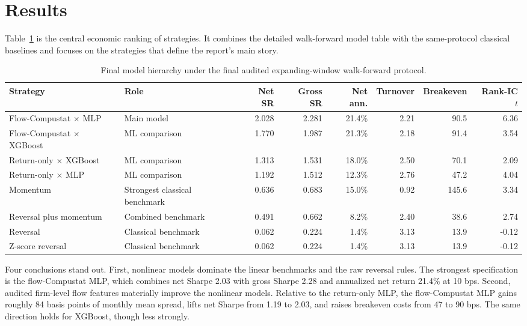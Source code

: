 \section{Results}

Table~\ref{tab:hierarchy} is the central economic ranking of
strategies. It combines the detailed walk-forward model table with the
same-protocol classical baselines and focuses on the strategies that define
the report's main story.

\begin{table}[t]
\centering
\scriptsize
\setlength{\tabcolsep}{4.5pt}
\begin{tabular*}{\textwidth}{@{\extracolsep{\fill}} llrrrrrr@{}}
\toprule
Strategy & Role & Net SR & Gross SR & Net ann. & Turnover & Breakeven & Rank-IC $t$ \\
\midrule
Flow-Compustat $\times$ MLP & Main model & 2.028 & 2.281 & 21.4\% & 2.21 & 90.5 & 6.36 \\
Flow-Compustat $\times$ XGBoost & ML comparison & 1.770 & 1.987 & 21.3\% & 2.18 & 91.4 & 3.54 \\
Return-only $\times$ XGBoost & ML comparison & 1.313 & 1.531 & 18.0\% & 2.50 & 70.1 & 2.09 \\
Return-only $\times$ MLP & ML comparison & 1.192 & 1.512 & 12.3\% & 2.76 & 47.2 & 4.04 \\
Momentum & Strongest classical benchmark & 0.636 & 0.683 & 15.0\% & 0.92 & 145.6 & 3.34 \\
Reversal plus momentum & Combined benchmark & 0.491 & 0.662 & 8.2\% & 2.40 & 38.6 & 2.74 \\
Reversal & Classical benchmark & 0.062 & 0.224 & 1.4\% & 3.13 & 13.9 & -0.12 \\
Z-score reversal & Classical benchmark & 0.062 & 0.224 & 1.4\% & 3.13 & 13.9 & -0.12 \\
\bottomrule
\end{tabular*}
\caption{Final model hierarchy under the final audited expanding-window
walk-forward protocol. }
\label{tab:hierarchy}
\end{table}

Four conclusions stand out. First, nonlinear models dominate the linear
benchmarks and the raw reversal rules. The strongest specification is
the flow-Compustat MLP, which combines net Sharpe 2.03 with gross Sharpe 2.28
and annualized net return 21.4\% at 10 bps. Second, audited firm-level flow
features materially improve the nonlinear models. Relative to the return-only
MLP, the flow-Compustat MLP gains roughly 84 basis points of monthly mean
spread, lifts net Sharpe from 1.19 to 2.03, and raises breakeven costs from
47 to 90 bps. The same direction holds for XGBoost, though less strongly.

